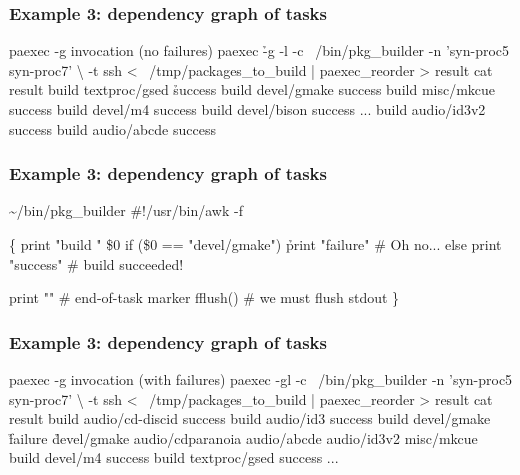 \documentclass[hyperref={colorlinks=true}]{beamer}
\begin{document}
\begin{frame}[fragile]
  \frametitle{Example 3: dependency graph of tasks}

  \begin{block}{}
      \begin{CodeSmall}{paexec -g invocation (no failures)}
\prompt{\$} paexec \h{-g} -l -c ~/bin/pkg_builder -n 'syn-proc5 syn-proc7' \textbackslash
    -t ssh < ~/tmp/packages_to_build | paexec_reorder > result
\prompt{\$} cat result
build textproc/gsed
\h{success}
build devel/gmake
success
build misc/mkcue
success
build devel/m4
success
build devel/bison
success
...
build audio/id3v2
success
build audio/abcde
success
\prompt{\$}
      \end{CodeSmall}
  \end{block}
\end{frame}

\begin{frame}[fragile]
  \frametitle{Example 3: dependency graph of tasks}

  \begin{block}{}
      \begin{CodeSmall}{\~{}/bin/pkg\_builder}
#!/usr/bin/awk -f

\{
   print "build " \$0
   if (\$0 == "devel/gmake")
      \h{print "failure"} # Oh no...
   else
      print "success" # build succeeded!

   print ""        # end-of-task marker
   fflush()        # we must flush stdout
\}
      \end{CodeSmall}
  \end{block}
\end{frame}

\begin{frame}[fragile]
  \frametitle{Example 3: dependency graph of tasks}

  \begin{block}{}
      \begin{CodeSmall}{paexec -g invocation (with failures)}
\prompt{\$} paexec -gl -c ~/bin/pkg_builder -n 'syn-proc5 syn-proc7' \textbackslash
    -t ssh < ~/tmp/packages_to_build | paexec_reorder > result
\prompt{\$} cat result
build audio/cd-discid
success
build audio/id3
success
build devel/gmake
\h{failure}
\h{devel/gmake audio/cdparanoia audio/abcde audio/id3v2 misc/mkcue}
build devel/m4
success
build textproc/gsed
success
...
\prompt{\$}
      \end{CodeSmall}
  \end{block}
\end{frame}
\end{document}
